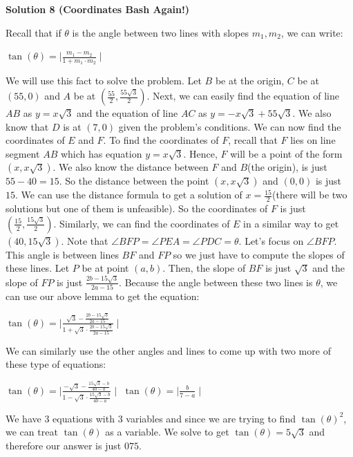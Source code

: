 \begin{enumerate}
{{ 



\textbf{Solution 8 (Coordinates Bash Again!)}

Recall that if $\theta$ is the angle between two lines with slopes $m_1, m_2$, we can write:

 $\tan(\theta) = \mid \frac{m_1 - m_2}{1 + m_1 \cdot m_2} \mid$ 

 We will use this fact to solve the problem. Let $B$ be at the origin, $C$ be at $(55, 0)$ and $A$ be at $(\frac{55}{2}, \frac{55\sqrt{3}}{2})$. Next, we can easily find the equation of line $AB$ as $y = x\sqrt{3}$ and the equation of line $AC$ as $y = -x\sqrt{3} + 55\sqrt{3}$. We also know that $D$ is at $(7, 0)$ given the problem's conditions. We can now find the coordinates of $E$ and $F$. To find the coordinates of $F$, recall that $F$ lies on line segment $AB$ which has equation $y = x\sqrt{3}$. Hence, $F$ will be a point of the form $(x, x\sqrt{3})$. We also know the distance between $F$ and $B$(the origin), is just $55 - 40 = 15$. So the distance between the point $(x, x\sqrt{3})$ and $(0, 0)$ is just $15$. We can use the distance formula to get a solution of $x = \frac{15}{2}$(there will be two solutions but one of them is unfeasible). So the coordinates of $F$ is just $(\frac{15}{2}, \frac{15\sqrt{3}}{2})$. Similarly, we can find the coordinates of $E$ in a similar way to get $(40, 15\sqrt{3})$. Note that $\angle BFP = \angle PEA = \angle PDC = \theta$. Let's focus on $\angle BFP$. This angle is between lines $BF$ and $FP$ so we just have to compute the slopes of these lines. Let $P$ be at point $(a, b)$. Then, the slope of $BF$ is just $\sqrt{3}$ and the slope of $FP$ is just $\frac{2b - 15\sqrt{3}}{2a - 15}$. Because the angle between these two lines is $\theta$, we can use our above lemma to get the equation:

 $\tan(\theta) = \mid \frac{\sqrt{3} - \frac{2b - 15\sqrt{3}}{2a - 15}}{1 + \sqrt{3} \cdot \frac{2b - 15\sqrt{3}}{2a - 15}} \mid$

 We can similarly use the other angles and lines to come up with two more of these type of equations:

 $\tan(\theta) = \mid \frac{-\sqrt{3} - \frac{15\sqrt{3} - b}{40 - a}}{1 - \sqrt{3} \cdot \frac{15\sqrt{3} - b}{40 - a}} \mid$
$\tan(\theta) = \mid \frac{b}{7 - a} \mid$

 We have $3$ equations with $3$ variables and since we are trying to find $\tan(\theta)^{2}$, we can treat $\tan(\theta)$ as a variable. We solve to get $\tan(\theta) = 5\sqrt{3}$ and therefore our answer is just $\boxed{075}$.

}}
\end{enumerate}
